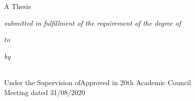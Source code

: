 \begin{titlepage}
    \centering
    {\LARGE \bfseries \ReportTitel}
    \vspace{1.5\baselineskip}
    
    {\large A Thesis}
    \vspace{1.5\baselineskip}

    {\large \it{submitted in fulfillment of the requirement of the degree of}}
    \vspace{1\baselineskip}

    {\Large \Degree}
    \vspace{1\baselineskip}

    {\large \it{to}}
    \vspace{1\baselineskip}

    {\large \it{\NUniv}}
    \vspace{1\baselineskip}

    {\large \it{by}}
    \vspace{1\baselineskip}

    {\large \FAuthor}
    \vspace{1\baselineskip}

    \regNo\\

    Under the Supervision ofApproved in 20th Academic Council \\
    \vfil
    Meeting dated 31/08/2020
\end{titlepage}
